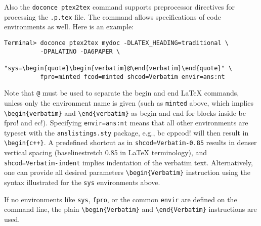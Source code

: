 \documentclass[%
oneside,                 %
final,                   %
10pt]{article}
\begin{document}
Also the {\fontsize{10pt}{10pt}\Verb!doconce ptex2tex!} command supports preprocessor directives
for processing the {\fontsize{10pt}{10pt}\Verb!.p.tex!} file. The command allows specifications
of code environments as well. Here is an example:
\vspace{4pt}
\begin{Verbatim}[numbers=none,frame=lines,fontsize=\fontsize{9pt}{9pt},labelposition=topline,framesep=2.5mm,framerule=0.7pt]
Terminal> doconce ptex2tex mydoc -DLATEX_HEADING=traditional \ 
          -DPALATINO -DA6PAPER \ 
          "sys=\begin{quote}\begin{verbatim}@\end{verbatim}\end{quote}" \ 
          fpro=minted fcod=minted shcod=Verbatim envir=ans:nt
\end{Verbatim}
Note that {\fontsize{10pt}{10pt}\Verb!@!} must be used to separate the begin and end {\LaTeX}
commands, unless only the environment name is given (such as {\fontsize{10pt}{10pt}\Verb!minted!}
above, which implies {\fontsize{10pt}{10pt}\Verb!\begin{verbatim}!} and {\fontsize{10pt}{10pt}\Verb!\end{verbatim}!} as
begin and end for blocks inside {\fontsize{10pt}{10pt}\Verb!!bc fpro!} and {\fontsize{10pt}{10pt}\Verb!!ec!}).  Specifying
{\fontsize{10pt}{10pt}\Verb!envir=ans:nt!} means that all other environments are typeset with the
{\fontsize{10pt}{10pt}\Verb!anslistings.sty!} package, e.g., {\fontsize{10pt}{10pt}\Verb!!bc cppcod!} will then result in
{\fontsize{10pt}{10pt}\Verb!\begin{c++}!}. A predefined shortcut as in {\fontsize{10pt}{10pt}\Verb!shcod=Verbatim-0.85!}
results in denser
vertical spacing (baselinestretch 0.85 in {\LaTeX} terminology), and
{\fontsize{10pt}{10pt}\Verb!shcod=Verbatim-indent!} implies indentation of the verbatim text.
Alternatively, one can provide all desired parameters
{\fontsize{10pt}{10pt}\Verb!\begin{Verbatim}!} instruction using the syntax illustrated for
the {\fontsize{10pt}{10pt}\Verb!sys!} environments above.

If no environments like {\fontsize{10pt}{10pt}\Verb!sys!}, {\fontsize{10pt}{10pt}\Verb!fpro!}, or the common
{\fontsize{10pt}{10pt}\Verb!envir!} are defined on the command line, the plain {\fontsize{10pt}{10pt}\Verb!\begin{Verbatim}!}
and {\fontsize{10pt}{10pt}\Verb!\end{Verbatim}!} instructions are used.
\end{document}

